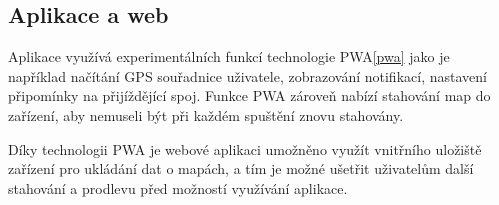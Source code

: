 \subsection{Aplikace a web}
Aplikace využívá experimentálních funkcí technologie PWA\ref{pwa} jako je například načítání GPS souřadnice uživatele, zobrazování notifikací, nastavení připomínky na přijíždějící spoj.
Funkce PWA zároveň nabízí stahování map do zařízení, aby nemuseli být při každém spuštění znovu stahovány.

Díky technologii PWA je webové aplikaci umožněno využít vnitřního uložiště zařízení pro ukládání dat o mapách, a tím je možné ušetřit uživatelům další stahování a prodlevu před možností využívání aplikace.
